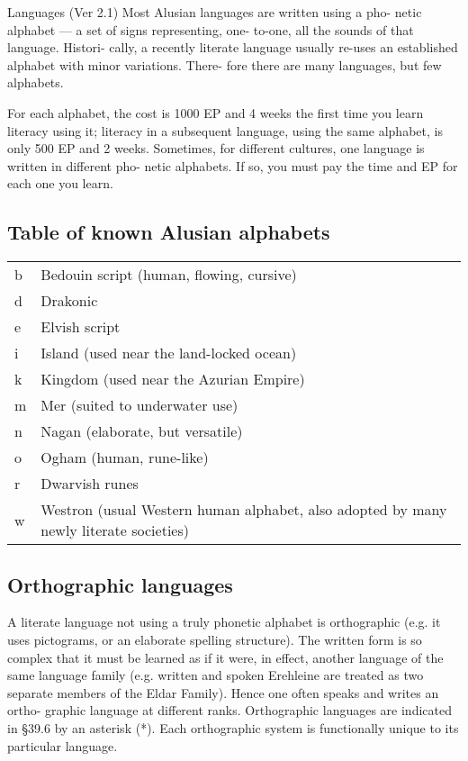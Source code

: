 \begin{Chapter}{Languages (Ver 2.1)}
Most  Alusian  languages  are  written  using  a  pho-
netic  alphabet  —  a  set  of  signs  representing,  one-
to-one,  all  the  sounds  of  that  language.  Histori-
cally, a recently literate language usually re-uses an 
established  alphabet  with  minor  variations.  There-
fore there are many languages, but few alphabets. 

For each alphabet, the cost is 1000 EP and 4 weeks 
the first time you learn literacy using it; literacy in 
a subsequent language, using the same alphabet, is 
only 500 EP and 2 weeks. Sometimes, for different 
cultures,  one  language  is  written  in  different  pho-
netic  alphabets.  If  so,  you  must  pay  the  time  and 
EP for each one you learn. 

\subsection{Table of known Alusian alphabets}

\begin{tabularx}{\columnwidth}{lX} \\
b &  Bedouin script (human, flowing, cursive) \\
d &  Drakonic \\
e &  Elvish script \\
i &  Island (used near the land-locked ocean) \\
k &  Kingdom (used near the Azurian Empire) \\
m &  Mer (suited to underwater use) \\
n &  Nagan (elaborate, but versatile) \\
o &  Ogham (human, rune-like) \\
r &  Dwarvish runes \\
w &  Westron (usual Western human alphabet, also adopted by many newly literate societies) \\
\end{tabularx}

\subsection{Orthographic languages}

A literate language not using a truly phonetic alphabet is
orthographic (e.g.  it uses pictograms, or an elaborate spelling
structure). The written form is so complex that it must be learned as
if it were, in effect, another language of the same language family
(e.g. written and spoken Erehleine are treated as two separate
members of the Eldar Family).  Hence one often speaks and writes an
ortho- graphic language at different ranks.  Orthographic languages
are indicated in §39.6 by an asterisk (*).  Each orthographic system
is functionally unique to its particular language.


\end{Chapter}
